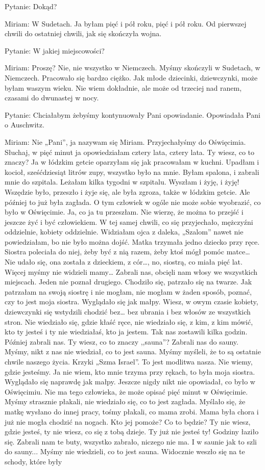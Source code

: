 Pytanie: Dokąd? 

Miriam: W Sudetach. Ja byłam pięć i pół roku, pięć i pół roku. Od pierwszej chwili do ostatniej chwili, jak się skończyła wojna. 

Pytanie: W jakiej miejscowości? 

Miriam: Proszę? Nie, nie wszystko w Niemczech. Myśmy skończyli w Sudetach, w Niemczech. Pracowało się bardzo ciężko. Jak młode dziecinki, dziewczynki, może byłam waszym wieku. Nie wiem dokładnie, ale może od trzeciej nad ranem, czasami do dwunastej w nocy. 

 

Pytanie: Chciałabym żebyśmy kontynuowały Pani opowiadanie. Opowiadała Pani o Auschwitz. 

Miriam: Nie „Pani”, ja nazywam się Miriam. Przyjechałyśmy do Oświęcimia. Słuchaj, w pięć minut ja opowiedziałam cztery lata, cztery lata. Ty wiesz, co to znaczy? Ja w łódzkim getcie oparzyłam się jak pracowałam w kuchni. Upadłam i kocioł, sześćdziesiąt litrów zupy, wszystko było na mnie. Byłam spalona, i zabrali mnie do szpitala. Leżałam kilka tygodni w szpitalu. Wyszłam i żyję, i żyję! Wszędzie było, przeszło i żyje się, ale była zgroza, także w łódzkim getcie. Ale później to już była zagłada. O tym człowiek w ogóle nie może sobie wyobrazić, co było w Oświęcimie. Ja, co ja tu przeszłam. Nie wierzę, że można to przejść i jeszcze żyć i być człowiekiem. W tej samej chwili, co się przyjechało, mężczyźni oddzielnie, kobiety oddzielnie. Widziałam ojca z daleka, „Szalom” nawet nie powiedziałam, bo nie było można dojść. Matka trzymała jedno dziecko przy ręce. Siostra poleciała do niej, żeby być z nią razem, żeby ktoś mógł pomóc matce… Nie udało się, ona została z dzieckiem, z cór…, no, siostrą, co miała pięć lat. Więcej myśmy nie widzieli mamy… Zabrali nas, obcięli nam włosy we wszystkich miejscach. Jeden nie poznał drugiego. Chodziło się, patrzało się na twarze. Jak patrzałam na swoją siostrę i nie mogłam, nie mogłam w żaden sposób, poznać, czy to jest moja siostra. Wyglądało się jak małpy. Wiesz, w owym czasie kobiety, dziewczynki się wstydzili chodzić bez… bez ubrania i bez włosów ze wszystkich stron. Nie wiedziało się, gdzie kłaść ręce, nie wiedziało się, z kim, z kim mówić, kto ty jesteś i ty nie wiedziałaś, kto ja jestem. Tak nas zostawili kilka godzin. Później zabrali nas. Ty wiesz, co to znaczy ,,sauna”? Zabrali nas do sauny. Myśmy, nikt z nas nie wiedział, co to jest sauna. Myśmy myśleli, że to są ostatnie chwile naszego życia. Krzyki „Szma Israel”. To jest modlitwa nasza. Nie wiemy, gdzie jesteśmy. Ja nie wiem, kto mnie trzyma przy rękach, to była moja siostra. Wyglądało się naprawdę jak małpy. Jeszcze nigdy nikt nie opowiadał, co było w Oświęcimiu. Nie ma tego człowieka, że może opisać pięć minut w Oświęcimie. Myśmy strasznie płakali, nie wiedziało się, co to jest zagłada. Myślało się, że matkę wysłano do innej pracy, tośmy płakali, co mama zrobi. Mama była chora i już nie mogła chodzić na nogach. Kto jej pomoże? Co to będzie? Ty nie wiesz, gdzie jesteś, ty nie wiesz, co się z tobą dzieje. Ty już nie jesteś ty! Godziny łaziło się. Zabrali nam te buty, wszystko zabrało, niczego nie ma. I w saunie jak to szli do sauny... Myśmy nie wiedzieli, co to jest sauna. Widocznie weszło się na te schody, które były 
